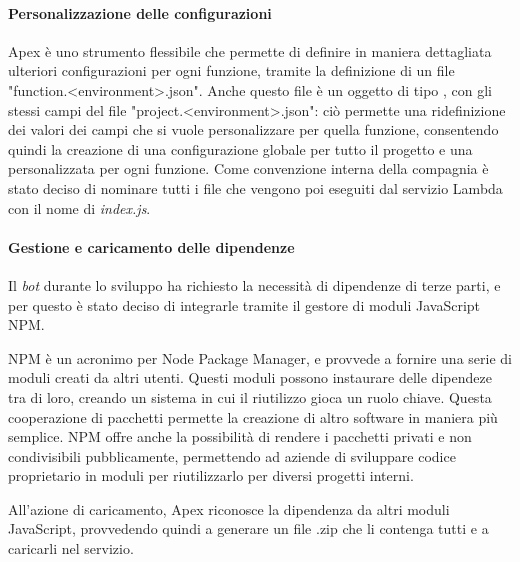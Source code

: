 \paragraph*{Personalizzazione delle configurazioni} Apex è uno strumento
flessibile che permette di definire in maniera dettagliata ulteriori
configurazioni per ogni funzione, tramite la definizione di un file
"function.<environment>.json". Anche questo file è un oggetto di tipo
, con gli stessi campi del file
"project.<environment>.json": ciò permette una ridefinizione dei valori dei
campi che si vuole personalizzare per quella funzione, consentendo quindi
la creazione di una configurazione globale per tutto il progetto e una
personalizzata per ogni funzione.
Come convenzione interna della compagnia è stato deciso di nominare tutti i
file che vengono poi eseguiti dal servizio Lambda con il nome di
\textit{index.js}.


\paragraph*{Gestione e caricamento delle dipendenze} Il \textit{bot} durante lo
sviluppo ha richiesto la necessità di dipendenze di terze parti, e per questo è
stato deciso di integrarle tramite il gestore di moduli JavaScript NPM.

NPM è un acronimo per Node Package Manager, e provvede a fornire una serie di
moduli creati da altri utenti. Questi moduli possono instaurare delle dipendeze
tra di loro, creando un sistema in cui il riutilizzo gioca un ruolo chiave.
Questa cooperazione di pacchetti permette la creazione di altro software in
maniera più semplice.
NPM offre anche la possibilità di rendere i pacchetti privati e non
condivisibili pubblicamente, permettendo ad aziende di sviluppare codice
proprietario in moduli per riutilizzarlo per diversi progetti interni.

All'azione di caricamento, Apex riconosce la dipendenza da altri moduli
JavaScript, provvedendo quindi a generare un file .zip che li contenga tutti e
a caricarli nel servizio.


